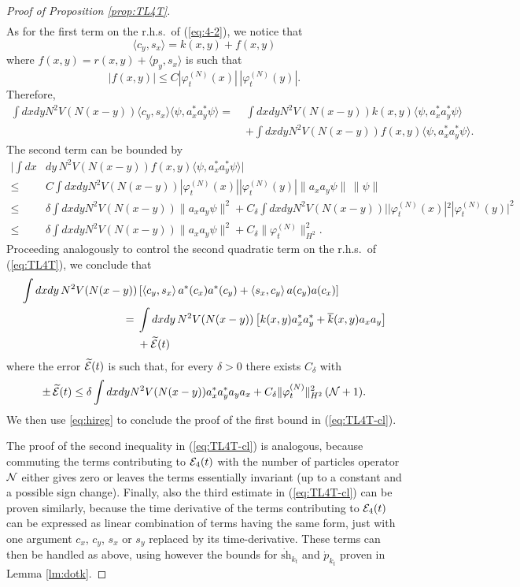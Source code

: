\documentclass[11pt,a4paper]{article}
\newcommand{\wt}{\widetilde}
\newcommand{\cE}{{\cal E}}
\newcommand{\cN}{{\cal N}}
\begin{document}
\begin{proof}[Proof of Proposition \ref{prop:TL4T}]
\[\begin{split}
\end{split} \]
As for the first term on the r.h.s.\ of (\ref{eq:4-2}), we notice that 
\[ \langle c_y , s_x \rangle = k (x,y) + f(x,y) \]
where $f(x,y) = r(x,y) + \langle p_y , s_x \rangle$ is such that
\[ |f(x,y) | \leq C |\varphi_t^{(N)} (x)| \, | \varphi_t^{(N)} (y)|. \]
Therefore,
\[ \begin{split} 
\int dx dy N^2 V(N (x-y)) \langle c_y , s_x \rangle \langle \psi , a^*_x a^*_y \psi \rangle =\; & \int dx dy N^2 V(N (x-y)) k(x,y)  \langle \psi , a^*_x a^*_y \psi \rangle \\ &+ \int dx dy N^2 V(N (x-y)) f(x,y) \langle \psi , a^*_x a^*_y \psi \rangle.
\end{split} \]
The second term can be bounded by
\[ \begin{split} 
\Big| \int dx &dy  \, N^2 V(N (x-y)) f(x,y) \langle \psi , a^*_x a^*_y \psi \rangle \Big| \\  \leq \; &C \int dx dy N^2 V(N (x-y)) |\varphi_t^{(N)} (x)| |\varphi_t^{(N)} (y)| \|  a_x a_y \psi \| \, \| \psi \| \\ \leq \; &\delta \int dx dy N^2 V(N (x-y)) \| a_x a_y \psi \|^2 + C_\delta \int dx dy N^2 V(N(x-y)) | |\varphi_t^{(N)} (x)|^2 |\varphi_t^{(N)} (y)|^2  \\ \leq \; & \delta \int dx dy N^2 V(N(x-y)) \| a_x a_y \psi \|^2 + C_\delta \| \varphi_t^{(N)} \|_{H^2}^2.  \end{split} \]
Proceeding analogously to control the second quadratic term on the r.h.s.\ of (\ref{eq:TL4T}), we conclude that 
\[ \begin{split} 
\int dx dy \, N^2 V (N (x-y)) & \left[ \langle c_y, s_x \rangle \,  a^* (c_x) a^* (c_y)  + \langle s_x, c_y \rangle \, a (c_y)  a(c_x) \right] \\  = \; & \int dx dy \, N^2 V(N(x-y))  \left[ k(x,y) a^*_x a^*_y + \overline{k} (x,y) a_x a_y \right] \\ &+ \wt{\cE} (t) \end{split} \]
where the error $\wt{\cE} (t)$ is such that, for every $\delta >0$ there exists $C_\delta$ with 
\[ \pm \, \wt{\cE} (t) \leq  \delta \int dx dy N^2 V(N (x-y)) a_x^* a_y^* a_y a_x + C_\delta \| \varphi_t^{(N)}  \|_{H^2}^2 \,  (\cN + 1). \]
We then use \eqref{eq:hireg} to conclude the proof of the first bound in (\ref{eq:TL4T-cl}).

The proof of the second inequality in (\ref{eq:TL4T-cl}) is analogous, because commuting the terms contributing to $\cE_4 (t)$ with the number of particles operator $\cN$ either gives zero or leaves the terms essentially invariant (up to a constant and a possible sign change). Finally, also the third estimate in (\ref{eq:TL4T-cl}) can be proven similarly, because the time derivative of the terms contributing to $\cE_4 (t)$ can be expressed as linear combination of terms having the same form, just with one argument $c_x$, $c_y$, $s_x$ or $s_y$ replaced by its time-derivative. These terms can then be handled as above, using however 
the bounds for $ \dot{\text{sh}}_{k_t}$ and $\dot{p}_{k_t}$ proven in Lemma \ref{lm:dotk}.
\end{proof}
\end{document}
